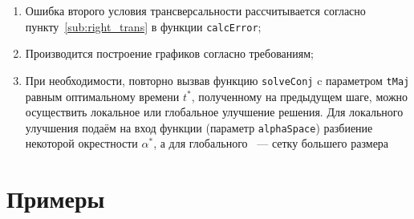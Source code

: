 \documentclass[11pt, oneside, final]{article}
\theoremstyle{break}
\numberwithin{equation}{section}
\theoremstyle{plain}
\theoremstyle{definition}
\begin{document}
\begin{enumerate}
        \item Ошибка второго условия трансверсальности рассчитывается согласно пункту~\ref{sub:right_trans} в функции \texttt{calcError};
        \item Производится построение графиков согласно требованиям;
        \item При необходимости, повторно вызвав функцию \texttt{solveConj} c параметром \texttt{tMaj} равным оптимальному времени \(t^*\), полученному на предыдущем шаге, можно осуществить локальное или глобальное улучшение решения. Для локального улучшения подаём на вход функции (параметр \texttt{alphaSpace}) разбиение некоторой окрестности \(\alpha^*\), а для глобального ~--- сетку большего размера
    \end{enumerate}
    \pagebreak
    \section{Примеры}
\end{document}
